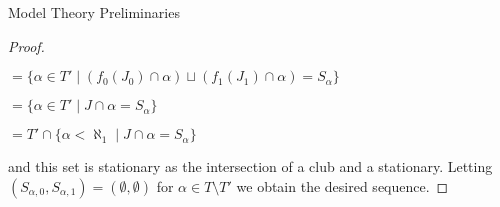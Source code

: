 \documentclass{amsart}
\theoremstyle{definition}\newtheorem{theorem}{Theorem}
\theoremstyle{definition}\newtheorem{bigtheorem}{Theorem}
\numberwithin{theorem}{section}
\theoremstyle{definition}\newtheorem{corollary}[theorem]{Corollary}
\theoremstyle{definition}\newtheorem{proposition}[theorem]{Proposition}
\theoremstyle{definition}\newtheorem{definition}[theorem]{Definition}
\theoremstyle{definition}\newtheorem{question}[theorem]{Question}
\theoremstyle{definition}\newtheorem{example}[theorem]{Example}
\theoremstyle{definition}\newtheorem{remark}[theorem]{Remark}
\theoremstyle{definition}\newtheorem{note}[theorem]{Note}
\theoremstyle{definition}\newtheorem{lemma}[theorem]{Lemma}
\theoremstyle{definition}\newtheorem{fact}[theorem]{Fact}
\theoremstyle{definition}\newtheorem{define}[theorem]{Definition}
\theoremstyle{definition}\newtheorem{definitions}[theorem]{Definitions}
\theoremstyle{definition}\newtheorem{claim}[theorem]{Claim}
\theoremstyle{definition}\newtheorem{obs}[theorem]{Observation}
\theoremstyle{definition}\newtheorem{construction}[theorem]{Construction}
\begin{document}
\begin{section}{Model Theory Preliminaries}
\begin{proof}
\begin{center}
$= \{\alpha \in T' \mid (f_0(J_0)\cap \alpha)\sqcup (f_1(J_1)\cap \alpha) = S_{\alpha}\}$

$= \{\alpha \in T' \mid J\cap \alpha = S_{\alpha}\}$

$= T' \cap \{\alpha < \aleph_1 \mid J \cap \alpha = S_{\alpha}\}$

\end{center}

\noindent and this set is stationary as the intersection of a club and a stationary.  Letting $(S_{\alpha, 0}, S_{\alpha, 1}) = (\emptyset, \emptyset)$ for $\alpha \in T\setminus T'$ we obtain the desired sequence.

\end{proof}

\end{section}
\end{document}
